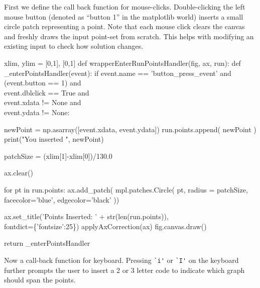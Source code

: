 First we define the call back function for mouse-clicks. Double-clicking the left mouse button (denoted as ``button 1'' in the matplotlib world)
inserts a small circle patch representing a point. Note that each mouse click 
clears the canvas
and freshly draws the input point-set from scratch. 
This helps with modifying an existing input to check how solution changes. 

\nwenddocs{}\plusendmoddef\nwstartdeflinemarkup{}\nwenddeflinemarkup
xlim, ylim = [0,1], [0,1]
def wrapperEnterRunPointsHandler(fig, ax, run):
    def _enterPointsHandler(event):
        if event.name      == 'button_press_event'     and \\
           (event.button   == 1)                       and \\
            event.dblclick == True                     and \\
            event.xdata  != None                       and \\
            event.ydata  != None:

             newPoint = np.asarray([event.xdata, event.ydata])
             run.points.append( newPoint  )
             print("You inserted ", newPoint)

             patchSize  = (xlim[1]-xlim[0])/130.0
                   
             ax.clear()

             for pt in run.points:
                  ax.add_patch( mpl.patches.Circle( pt, radius = patchSize,
                                                    facecolor='blue', edgecolor='black'  ))

             ax.set_title('Points Inserted: ' + str(len(run.points)), \\
                           fontdict=\{'fontsize':25\})
             applyAxCorrection(ax)
             fig.canvas.draw()

    return _enterPointsHandler
\nwendcode{}\nwdocspar

Now a call-back function for keyboard. Pressing \verb|`i'| or \verb|`I'| on the keyboard further prompts the 
user to insert a 2 or 3 letter code to indicate which graph should span the points. 

